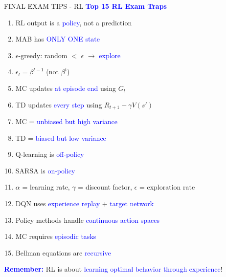 \documentclass[8pt]{beamer}
\begin{document}
	\begin{frame}{FINAL EXAM TIPS - RL}
		\fontsize{6.5}{7.5}\selectfont
		\textcolor{blue}{\textbf{Top 15 RL Exam Traps}}
		
		\begin{enumerate}
			\item RL output is a \textcolor{blue}{policy}, not a prediction
			\item MAB has \textcolor{blue}{ONLY ONE state}
			\item $\epsilon$-greedy: random $<$ $\epsilon$ $\rightarrow$ \textcolor{blue}{explore}
			\item $\epsilon_t = \beta^{t-1}$ (not $\beta^t$)
			\item MC updates \textcolor{blue}{at episode end} using $G_t$
			\item TD updates \textcolor{blue}{every step} using $R_{t+1} + \gamma V(s')$
			\item MC = \textcolor{blue}{unbiased but high variance}
			\item TD = \textcolor{blue}{biased but low variance}
			\item Q-learning is \textcolor{blue}{off-policy}
			\item SARSA is \textcolor{blue}{on-policy}
			\item $\alpha$ = learning rate, $\gamma$ = discount factor, $\epsilon$ = exploration rate
			\item DQN uses \textcolor{blue}{experience replay} + \textcolor{blue}{target network}
			\item Policy methods handle \textcolor{blue}{continuous action spaces}
			\item MC requires \textcolor{blue}{episodic tasks}
			\item Bellman equations are \textcolor{blue}{recursive}
		\end{enumerate}
		
		\textcolor{blue}{\textbf{Remember:}} RL is about \textcolor{blue}{learning optimal behavior through experience}!
	\end{frame}
	
\end{document}
